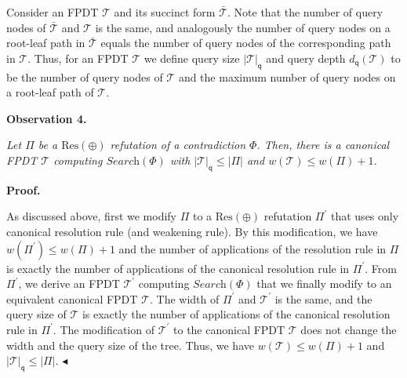 \documentclass[10pt,a4paper]{article}
\begin{document}
Consider an FPDT $\mathcal{T}$ and its succinct form $\bar{\mathcal{T}}$.
Note that the number of query nodes of $\bar{\mathcal{T}}$ and $\mathcal{T}$ is the same,
and analogously the number of query nodes on a root-leaf path in $\bar{\mathcal{T}}$ equals the number of query nodes of the corresponding path in $\mathcal{T}$.
Thus, for an FPDT $\mathcal{T}$ we define query size $|\mathcal{T}|_{\mathsf{q}}$ and query depth $d_{\mathsf{q}}(\mathcal{T})$ to be the number of query nodes of $\mathcal{T}$ and the maximum number of query nodes on a root-leaf path of $\mathcal{T}$.\par





\par\medskip\noindent\textbf{
\textbf{Observation 4}\textbf{.}
}\par



\emph{Let $\Pi$ be a $\text{Res}(\oplus)$ refutation of a contradiction $\Phi$.
Then, there is a canonical FPDT $\mathcal{T}$ computing $\textit{Search}(\Phi)$ with $|\mathcal{T}|_{\mathsf{q}}\leq|\Pi|$ and $w(\mathcal{T})\leq w(\Pi)+1$.}\par






\par\medskip\noindent\textbf{Proof.}\par




As discussed above, first we modify $\Pi$ to a $\text{Res}(\oplus)$ refutation $\Pi^{\prime}$ that uses only canonical resolution rule (and weakening rule).
By this modification, we have $w(\Pi^{\prime})\leq w(\Pi)+1$ and the number of applications of the resolution rule in $\Pi$ is exactly the number of applications of the canonical resolution rule in $\Pi^{\prime}$.
From $\Pi^{\prime}$, we derive an FPDT $\mathcal{T}^{\prime}$ computing $\textit{Search}(\Phi)$ that we finally modify to an equivalent canonical FPDT $\mathcal{T}$.
The width of $\Pi^{\prime}$ and $\mathcal{T}^{\prime}$ is the same, and the query size of $\mathcal{T}$ is exactly the number of applications of the canonical resolution rule in $\Pi^{\prime}$.
The modification of $\mathcal{T}^{\prime}$ to the canonical FPDT $\mathcal{T}$ does not change the width and the query size of the tree.
Thus, we have $w(\mathcal{T})\leq w(\Pi)+1$ and $|\mathcal{T}|_{\mathsf{q}}\leq|\Pi|$.
$\blacktriangleleft$\par
\end{document}
